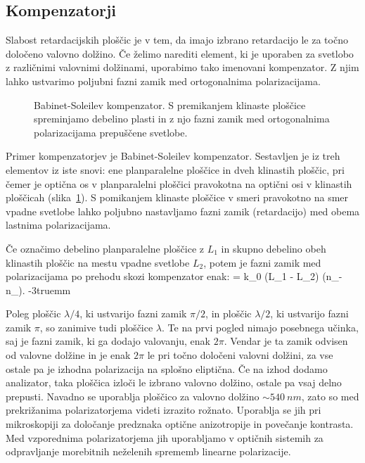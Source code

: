 \subsection*{Kompenzatorji}
Slabost retardacijskih ploščic je v tem, da imajo izbrano retardacijo le za 
točno določeno valovno dolžino. Če želimo narediti element, ki je uporaben za svetlobo z 
različnimi valovnimi dolžinami, uporabimo tako imenovani kompenzator. Z njim lahko 
ustvarimo poljubni fazni zamik med ortogonalnima polarizacijama. 
\begin{figure}[!h]
\centering
\def\svgwidth{70truemm} 

\caption{Babinet-Soleilev kompenzator. S premikanjem klinaste ploščice spreminjamo debelino
plasti in z njo fazni zamik med ortogonalnima polarizacijama prepuščene svetlobe.}
\label{fig:10_Soleil}
\end{figure}

Primer kompenzatorjev je Babinet-Soleilev kompenzator.
Sestavljen je iz treh elementov iz iste snovi: ene planparalelne ploščice in dveh klinastih ploščic, 
pri čemer je optična os v planparalelni ploščici pravokotna na optični osi v klinastih ploščicah 
(slika~\ref{fig:10_Soleil}). S pomikanjem klinaste ploščice v smeri pravokotno na smer vpadne 
svetlobe lahko poljubno nastavljamo fazni zamik (retardacijo) med obema lastnima polarizacijama.

Če označimo debelino planparalelne ploščice z $L_1$ in skupno debelino obeh klinastih ploščic
na mestu vpadne svetlobe $L_2$, potem je fazni zamik med polarizacijama po prehodu skozi kompenzator
enak:
\beq
\Delta \phi = k_0 (L_1 - L_2) (n_\myparallel - n_\perp).
\eeq
\vglue-3truemm
\begin{remark}
Poleg ploščic $\lambda/4$, ki ustvarijo fazni zamik $\pi/2$, in ploščic $\lambda/2$,
ki ustvarijo fazni zamik $\pi$, so zanimive tudi ploščice $\lambda$. Te na prvi pogled nimajo
posebnega učinka, saj je fazni zamik, ki ga dodajo valovanju, enak $2\pi$. Vendar je ta zamik odvisen
od valovne dolžine in je enak $2\pi$ le pri točno določeni valovni dolžini,
za vse ostale pa je izhodna polarizacija na splošno eliptična. Če na izhod dodamo 
analizator, taka ploščica izloči le izbrano valovno dolžino, ostale pa vsaj delno prepusti. 
Navadno se uporablja ploščico za valovno dolžino $\sim 540~\si{nm}$, zato so med prekrižanima
polarizatorjema videti izrazito rožnato. Uporablja se jih pri mikroskopiji za določanje predznaka
optične anizotropije in povečanje kontrasta. Med vzporednima polarizatorjema jih uporabljamo
v optičnih sistemih za odpravljanje morebitnih neželenih sprememb linearne polarizacije. 
\end{remark}

